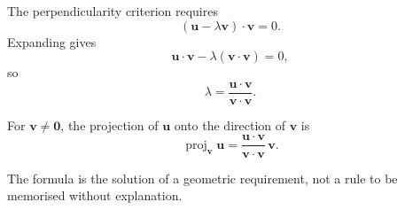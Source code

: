 \begin{derivationbox}
The perpendicularity criterion requires
\[
(\mathbf u-\lambda\mathbf v)\cdot\mathbf v=0.
\]
Expanding gives
\[
\mathbf u\cdot\mathbf v-
\lambda(\mathbf v\cdot\mathbf v)=0,
\]
so
\[
\lambda
=
\frac{\mathbf u\cdot\mathbf v}{\mathbf v\cdot\mathbf v}.
\]
\end{derivationbox}

\begin{definitionbox}
For $\mathbf v\neq\mathbf0$, the projection of $\mathbf u$ onto the direction
of $\mathbf v$ is
\[
\boxed{
\operatorname{proj}_{\mathbf v}\mathbf u
=
\frac{\mathbf u\cdot\mathbf v}{\mathbf v\cdot\mathbf v}\,\mathbf v.
}
\]
\end{definitionbox}

\begin{remarkbox}
The formula is the solution of a geometric requirement, not a rule to be
memorised without explanation.
\end{remarkbox}
